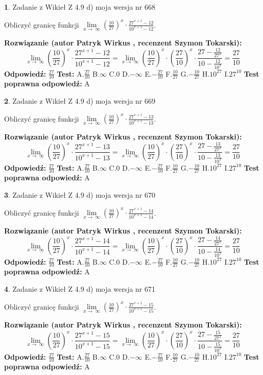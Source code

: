 \documentclass[12pt, a4paper]{article}
\theoremstyle{definition} %
\newtheorem{zad}{}
\newcommand{\zadStart}[1]{\begin{zad}#1\newline}
\newcommand{\zadStop}{\end{zad}}
\newcommand{\rozwStart}[2]{\noindent \textbf{Rozwiązanie (autor #1 , recenzent #2): }\newline}
\newcommand{\rozwStop}{\newline}
\newcommand{\odpStart}{\noindent \textbf{Odpowiedź:}\newline}
\newcommand{\odpStop}{\newline}
\newcommand{\testStart}{\noindent \textbf{Test:}\newline}
\newcommand{\testStop}{\newline}
\newcommand{\kluczStart}{\noindent \textbf{Test poprawna odpowiedź:}\newline}
\newcommand{\kluczStop}{\newline}
\begin{document}
\zadStart{Zadanie z Wikieł Z 4.9 d) moja wersja nr 668}


Obliczyć granicę funkcji  $\lim\limits_{x\to\ \infty}(\frac{10}{27})^{x}\cdot\frac{27^{x+1}-12}{10^{x+1}-12}$.
\zadStop
\rozwStart{Patryk Wirkus}{Szymon Tokarski}
$$\lim\limits_{x\to\ \infty}(\frac{10}{27})^{x}\cdot\frac{27^{x+1}-12}{10^{x+1}-12}=\lim\limits_{x\to\ \infty}(\frac{10}{27})^{x}\cdot(\frac{27}{10})^{x} \cdot \frac{27-\frac{12}{27^{x}}}{10-\frac{12}{10^{x}}} = \frac{27}{10}$$
\rozwStop
\odpStart
$\frac{27}{10}$
\odpStop
\testStart
A.$\frac{27}{10}$ B.$\infty$ C.$0$ D.$-\infty$ E.$-\frac{27}{10}$
F.$\frac{10}{27}$ G.$-\frac{10}{27}$
H.$10^{27}$
I.$27^{10}$
\testStop
\kluczStart
A
\kluczStop



\zadStart{Zadanie z Wikieł Z 4.9 d) moja wersja nr 669}


Obliczyć granicę funkcji  $\lim\limits_{x\to\ \infty}(\frac{10}{27})^{x}\cdot\frac{27^{x+1}-13}{10^{x+1}-13}$.
\zadStop
\rozwStart{Patryk Wirkus}{Szymon Tokarski}
$$\lim\limits_{x\to\ \infty}(\frac{10}{27})^{x}\cdot\frac{27^{x+1}-13}{10^{x+1}-13}=\lim\limits_{x\to\ \infty}(\frac{10}{27})^{x}\cdot(\frac{27}{10})^{x} \cdot \frac{27-\frac{13}{27^{x}}}{10-\frac{13}{10^{x}}} = \frac{27}{10}$$
\rozwStop
\odpStart
$\frac{27}{10}$
\odpStop
\testStart
A.$\frac{27}{10}$ B.$\infty$ C.$0$ D.$-\infty$ E.$-\frac{27}{10}$
F.$\frac{10}{27}$ G.$-\frac{10}{27}$
H.$10^{27}$
I.$27^{10}$
\testStop
\kluczStart
A
\kluczStop



\zadStart{Zadanie z Wikieł Z 4.9 d) moja wersja nr 670}


Obliczyć granicę funkcji  $\lim\limits_{x\to\ \infty}(\frac{10}{27})^{x}\cdot\frac{27^{x+1}-14}{10^{x+1}-14}$.
\zadStop
\rozwStart{Patryk Wirkus}{Szymon Tokarski}
$$\lim\limits_{x\to\ \infty}(\frac{10}{27})^{x}\cdot\frac{27^{x+1}-14}{10^{x+1}-14}=\lim\limits_{x\to\ \infty}(\frac{10}{27})^{x}\cdot(\frac{27}{10})^{x} \cdot \frac{27-\frac{14}{27^{x}}}{10-\frac{14}{10^{x}}} = \frac{27}{10}$$
\rozwStop
\odpStart
$\frac{27}{10}$
\odpStop
\testStart
A.$\frac{27}{10}$ B.$\infty$ C.$0$ D.$-\infty$ E.$-\frac{27}{10}$
F.$\frac{10}{27}$ G.$-\frac{10}{27}$
H.$10^{27}$
I.$27^{10}$
\testStop
\kluczStart
A
\kluczStop



\zadStart{Zadanie z Wikieł Z 4.9 d) moja wersja nr 671}


Obliczyć granicę funkcji  $\lim\limits_{x\to\ \infty}(\frac{10}{27})^{x}\cdot\frac{27^{x+1}-15}{10^{x+1}-15}$.
\zadStop
\rozwStart{Patryk Wirkus}{Szymon Tokarski}
$$\lim\limits_{x\to\ \infty}(\frac{10}{27})^{x}\cdot\frac{27^{x+1}-15}{10^{x+1}-15}=\lim\limits_{x\to\ \infty}(\frac{10}{27})^{x}\cdot(\frac{27}{10})^{x} \cdot \frac{27-\frac{15}{27^{x}}}{10-\frac{15}{10^{x}}} = \frac{27}{10}$$
\rozwStop
\odpStart
$\frac{27}{10}$
\odpStop
\testStart
A.$\frac{27}{10}$ B.$\infty$ C.$0$ D.$-\infty$ E.$-\frac{27}{10}$
F.$\frac{10}{27}$ G.$-\frac{10}{27}$
H.$10^{27}$
I.$27^{10}$
\testStop
\kluczStart
A
\kluczStop
\end{document}
